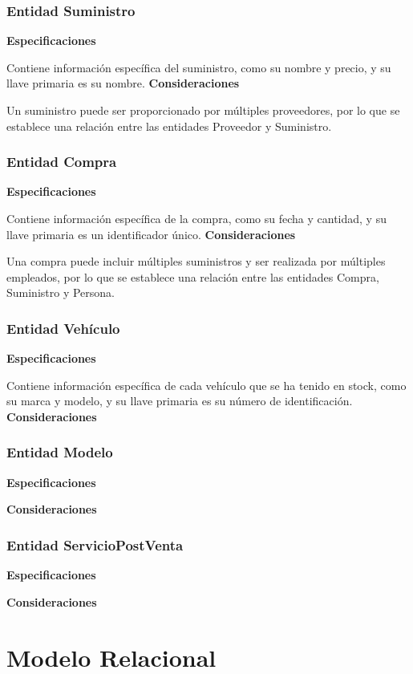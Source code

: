 \documentclass[12pt]{article}
\begin{document}
\subsubsection{Entidad Suministro}
\textbf{Especificaciones}

Contiene información específica del suministro, como su nombre y precio, y su llave primaria es su nombre.
\textbf{Consideraciones}

Un suministro puede ser proporcionado por múltiples proveedores, por lo que se establece una relación entre las entidades Proveedor y Suministro.

\subsubsection{Entidad Compra}
\textbf{Especificaciones}

Contiene información específica de la compra, como su fecha y cantidad, y su llave primaria es un identificador único.
\textbf{Consideraciones}

Una compra puede incluir múltiples suministros y ser realizada por múltiples empleados, por lo que se establece una relación entre las entidades Compra, Suministro y Persona.

\subsubsection{Entidad Vehículo}
\textbf{Especificaciones}

Contiene información específica de cada vehículo que se ha tenido en stock, como su marca y modelo, y su llave primaria es su número de identificación.
\textbf{Consideraciones}



\subsubsection{Entidad Modelo}
\textbf{Especificaciones}

\textbf{Consideraciones}


\subsubsection{Entidad ServicioPostVenta}
\textbf{Especificaciones}

\textbf{Consideraciones}


\section{Modelo Relacional}
\end{document}
